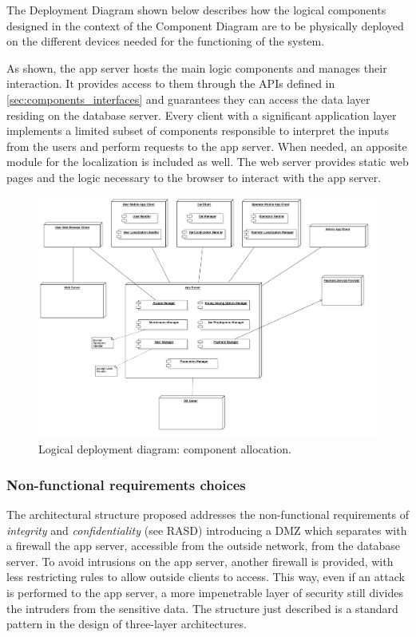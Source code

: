 The Deployment Diagram shown below describes how the logical components designed in the context of the Component Diagram are to be physically deployed on the different devices needed for the functioning of the system.

As shown, the app server hosts the main logic components and manages their interaction. It provides access to them through the APIs defined in \autoref{sec:components_interfaces} and guarantees they can access the data layer residing on the database server.\newline
Every client with a significant application layer implements a limited subset of components responsible to interpret the inputs from the users and perform requests to the app server. When needed, an apposite module for the localization is included as well.\newline
The web server provides static web pages and the logic necessary to the browser to interact with the app server.

\begin{figure}
	\includegraphics[width=\hsize, center]{img/deployment_diagrams/global.png}
	\caption{Logical deployment diagram: component allocation.}
\end{figure}

\subsubsection{Non-functional requirements choices}
	The architectural structure proposed addresses the non-functional requirements of \textit{integrity} and \textit{confidentiality} (see RASD) introducing a DMZ which separates with a firewall the app server, accessible from the outside network, from the database server. To avoid intrusions on the app server, another firewall is provided, with less restricting rules to allow outside clients to access. This way, even if an attack is performed to the app server, a more impenetrable layer of security still divides the intruders from the sensitive data. The structure just described is a standard pattern in the design of three-layer architectures.

